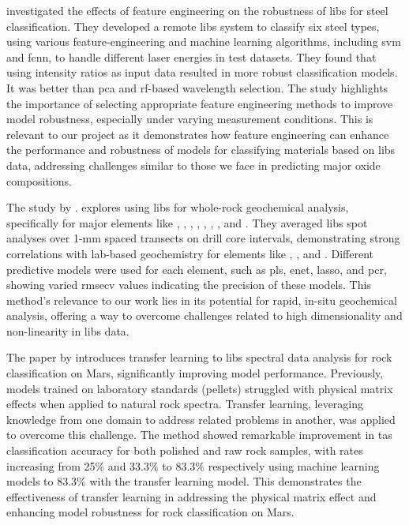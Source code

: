 \citet{jeonEffectsFeatureEngineering2024} investigated the effects of feature engineering on the robustness of \gls{libs} for steel classification.
They developed a remote \gls{libs} system to classify six steel types, using various feature-engineering and machine learning algorithms, including \gls{svm} and \gls{fcnn}, to handle different laser energies in test datasets.
They found that using intensity ratios as input data resulted in more robust classification models.
It was better than \gls{pca} and \gls{rf}-based wavelength selection.
The study highlights the importance of selecting appropriate feature engineering methods to improve model robustness, especially under varying measurement conditions.
This is relevant to our project as it demonstrates how feature engineering can enhance the performance and robustness of models for classifying materials based on \gls{libs} data, addressing challenges similar to those we face in predicting major oxide compositions.

The study by \citet{fontanaLaserInducedBreakdown2023}.
explores using \gls{libs} for whole-rock geochemical analysis, specifically for major elements like , , , , , , , and .
They averaged \gls{libs} spot analyses over 1-mm spaced transects on drill core intervals, demonstrating strong correlations with lab-based geochemistry for elements like , , and .
Different predictive models were used for each element, such as \gls{pls}, \gls{enet}, \gls{lasso}, and \gls{pcr}, showing varied \gls{rmsecv} values indicating the precision of these models.
This method's relevance to our work lies in its potential for rapid, in-situ geochemical analysis, offering a way to overcome challenges related to high dimensionality and non-linearity in \gls{libs} data.

The paper by \citet{sunMachineLearningTransfer2021} introduces transfer learning to \gls{libs} spectral data analysis for rock classification on Mars, significantly improving model performance.
Previously, models trained on laboratory standards (pellets) struggled with physical matrix effects when applied to natural rock spectra.
Transfer learning, leveraging knowledge from one domain to address related problems in another, was applied to overcome this challenge.
The method showed remarkable improvement in \gls{tas} classification accuracy for both polished and raw rock samples, with rates increasing from 25\% and 33.3\% to 83.3\% respectively using machine learning models to 83.3\% with the transfer learning model.
This demonstrates the effectiveness of transfer learning in addressing the physical matrix effect and enhancing model robustness for rock classification on Mars.

